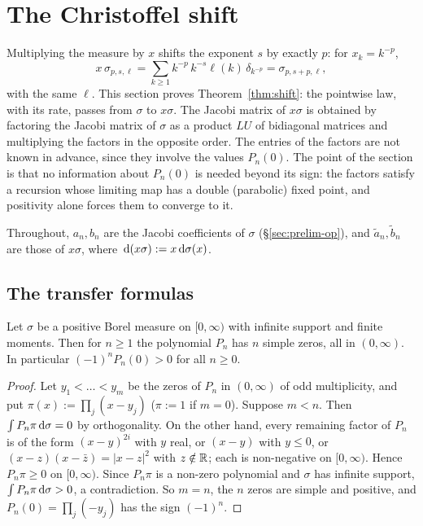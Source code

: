 
\section{The Christoffel shift}\label{sec:shift}

Multiplying the measure by $x$ shifts the exponent $s$ by exactly $p$: for $x_k=k^{-p}$,
\begin{equation}\label{eq:shift-identity}
  x\,\sigma_{p,s,\ell}=\sum_{k\ge1}k^{-p}\,k^{-s}\ell(k)\,\delta_{k^{-p}}=\sigma_{p,s+p,\ell},
\end{equation}
with the same $\ell$. This section proves Theorem~\ref{thm:shift}: the pointwise law, with its rate, passes from
$\sigma$ to $x\sigma$. The Jacobi matrix of $x\sigma$ is obtained by factoring the Jacobi matrix of $\sigma$ as a product
$LU$ of bidiagonal matrices and multiplying the factors in the opposite order. The entries of the factors are not
known in advance, since they involve the values $P_n(0)$. The point of the section is that no information about
$P_n(0)$ is needed beyond its sign: the factors satisfy a recursion whose limiting map has a double (parabolic) fixed
point, and positivity alone forces them to converge to it.

Throughout, $a_n,b_n$ are the Jacobi coefficients of $\sigma$ (\S\ref{sec:prelim-op}), and $\tilde a_n,\tilde b_n$
are those of $x\sigma$, where $\,\mathrm{d}(x\sigma):=x\,\mathrm{d}\sigma(x)$.

\subsection{The transfer formulas}

\begin{lemma}\label{lem:zeros}
Let $\sigma$ be a positive Borel measure on $[0,\infty)$ with infinite support and finite moments. Then for $n\ge1$ the
polynomial $P_n$ has $n$ simple zeros, all in $(0,\infty)$. In particular $(-1)^nP_n(0)>0$ for all $n\ge0$.
\end{lemma}

\begin{proof}
Let $y_1<\dots<y_m$ be the zeros of $P_n$ in $(0,\infty)$ of odd multiplicity, and put $\pi(x):=\prod_j(x-y_j)$
($\pi:=1$ if $m=0$). Suppose $m<n$. Then $\int P_n\pi\,\mathrm{d}\sigma=0$ by orthogonality. On the other hand, every
remaining factor of $P_n$ is of the form $(x-y)^{2i}$ with $y$ real, or $(x-y)$ with $y\le0$, or
$(x-z)(x-\bar z)=|x-z|^2$ with $z\notin\mathbb{R}$; each is non-negative on $[0,\infty)$. Hence $P_n\pi\ge0$ on $[0,\infty)$.
Since $P_n\pi$ is a non-zero polynomial and $\sigma$ has infinite support, $\int P_n\pi\,\mathrm{d}\sigma>0$, a contradiction.
So $m=n$, the $n$ zeros are simple and positive, and $P_n(0)=\prod_j(-y_j)$ has the sign $(-1)^n$.
\end{proof}

